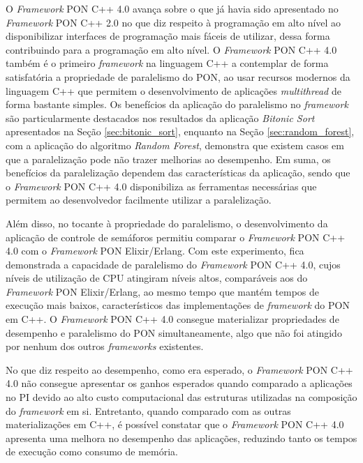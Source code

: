 O \textit{Framework} PON C++ 4.0 avança sobre o que já havia sido apresentado no
\textit{Framework} PON C++ 2.0 no que diz respeito à programação em alto nível
ao disponibilizar interfaces de programação mais fáceis de utilizar, dessa forma
contribuindo para a programação em alto nível. O \textit{Framework} PON C++ 4.0
também é o primeiro \textit{framework} na linguagem C++ a contemplar de forma
satisfatória a propriedade de paralelismo do PON, ao usar recursos
modernos da linguagem C++ que permitem o desenvolvimento de aplicações
\textit{multithread} de forma bastante simples. Os benefícios da aplicação do
paralelismo no \textit{framework} são particularmente destacados nos resultados
da aplicação \textit{Bitonic Sort} apresentados na Seção \ref{sec:bitonic_sort},
enquanto na Seção \ref{sec:random_forest}, com a aplicação do algoritmo
\textit{Random Forest}, demonstra que existem casos em que a paralelização pode
não trazer melhorias ao desempenho. Em suma, os benefícios da paralelização
dependem das características da aplicação, sendo que o \textit{Framework} PON
C++ 4.0 disponibiliza as ferramentas necessárias que permitem ao desenvolvedor
facilmente utilizar a paralelização.

Além disso, no tocante à propriedade do paralelismo, o desenvolvimento da
aplicação de controle de semáforos permitiu comparar o \textit{Framework} PON
C++ 4.0 com o \textit{Framework} PON Elixir/Erlang. Com este experimento, fica
demonstrada a capacidade de paralelismo do \textit{Framework} PON C++ 4.0, cujos
níveis de utilização de CPU atingiram níveis altos, comparáveis aos do
\textit{Framework} PON Elixir/Erlang, ao mesmo tempo que mantém tempos de
execução mais baixos, característicos das implementações de \textit{framework}
do PON em C++. O \textit{Framework} PON C++ 4.0 consegue materializar
propriedades de desempenho e paralelismo do PON simultaneamente, algo que não
foi atingido por nenhum dos outros \textit{frameworks} existentes.

No que diz respeito ao desempenho, como era esperado, o \textit{Framework} PON
C++ 4.0 não consegue apresentar os ganhos esperados quando comparado a
aplicações no PI devido ao alto custo computacional das estruturas utilizadas na
composição do \textit{framework} em si. Entretanto, quando comparado com as
outras materializações em C++, é possível constatar que o \textit{Framework} PON
C++ 4.0 apresenta uma melhora no desempenho das aplicações, reduzindo tanto os
tempos de execução como consumo de memória.

